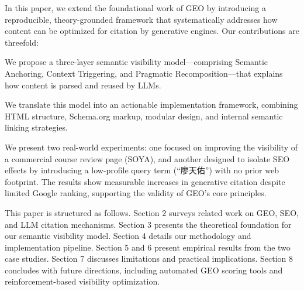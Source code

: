In this paper, we extend the foundational work of GEO by introducing a reproducible, theory-grounded framework that systematically addresses how content can be optimized for citation by generative engines. Our contributions are threefold:

We propose a three-layer semantic visibility model—comprising Semantic Anchoring, Context Triggering, and Pragmatic Recomposition—that explains how content is parsed and reused by LLMs.

We translate this model into an actionable implementation framework, combining HTML structure, Schema.org markup, modular design, and internal semantic linking strategies.

We present two real-world experiments: one focused on improving the visibility of a commercial course review page (SOYA), and another designed to isolate SEO effects by introducing a low-profile query term (“廖天佑”) with no prior web footprint. The results show measurable increases in generative citation despite limited Google ranking, supporting the validity of GEO’s core principles.

This paper is structured as follows. Section 2 surveys related work on GEO, SEO, and LLM citation mechanisms. Section 3 presents the theoretical foundation for our semantic visibility model. Section 4 details our methodology and implementation pipeline. Section 5 and 6 present empirical results from the two case studies. Section 7 discusses limitations and practical implications. Section 8 concludes with future directions, including automated GEO scoring tools and reinforcement-based visibility optimization.
